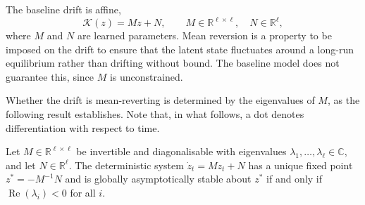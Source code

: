 \begin{description}[
    style=unboxed,
    leftmargin=0pt,
    labelindent=0pt,
    labelsep=0.5em
]
\item[Drift stability.] The baseline drift is affine,
\[
\mathcal{K}(z)=Mz+N,
\qquad
M\in\mathbb{R}^{\ell\times\ell},
\quad
N\in\mathbb{R}^{\ell},
\]
where \(M\) and \(N\) are learned parameters. Mean reversion is a property to be imposed on the drift to ensure that the latent state fluctuates around a long-run equilibrium rather than drifting without bound. The baseline model does not guarantee this, since \(M\) is unconstrained.

Whether the drift is mean-reverting is determined by the eigenvalues 
of $M$, as the following result establishes. Note that, in what follows, a dot denotes differentiation with respect to time.

\begin{proposition}
Let $M\in\mathbb{R}^{\ell\times\ell}$ be invertible and diagonalisable
with eigenvalues $\lambda_1,\ldots,\lambda_\ell\in\mathbb{C}$, and let
$N\in\mathbb{R}^{\ell}$. The deterministic system $\dot{z}_t = Mz_t + N$
has a unique fixed point $z^* = -M^{-1}N$ and is globally asymptotically
stable about $z^*$ if and only if $\operatorname{Re}(\lambda_i) < 0$
for all $i$.
\label{prop:meanreversion}
\end{proposition}


\end{description}

